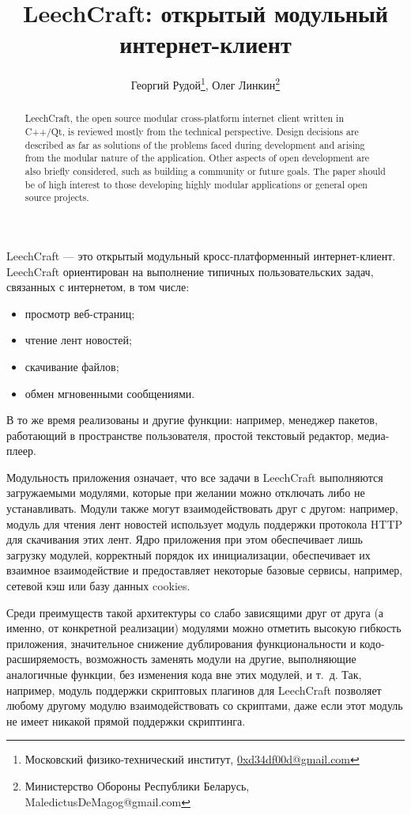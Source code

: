 \documentclass[10pt, a5paper]{article}
\begin{document}
\title{LeechCraft: открытый модульный интернет-клиент}

\author{Георгий Рудой\footnote{Московский физико-технический институт, \url{0xd34df00d@gmail.com}}, Олег Линкин\footnote{Министерство Обороны Республики Беларусь, MaledictusDeMagog@gmail.com}}
\date{}
\maketitle

\begin{abstract}
LeechCraft, the open source modular
cross-platform internet client written in C++/Qt, is reviewed mostly from the
technical perspective. Design decisions are described as far as solutions of
the problems faced during development and arising from the modular
nature of the application. Other aspects of open development are also
briefly considered, such as building a community or future goals. 
The paper should be of high interest to those developing highly modular
applications or general open source projects.
\end{abstract}

LeechCraft --- это открытый модульный кросс-платформенный
интернет-клиент. LeechCraft ориентирован на выполнение типичных
пользовательских задач, связанных с интернетом, в том числе:
\begin{itemize}
	\item просмотр веб-страниц;
	\item чтение лент новостей;
	\item скачивание файлов;
	\item обмен мгновенными сообщениями. 
\end{itemize}
В то же время реализованы и другие функции: например, менеджер
пакетов, работающий в пространстве пользователя, простой текстовый
редактор, медиа-плеер.

Модульность приложения означает, что все задачи в LeechCraft
выполняются загружаемыми модулями, которые при желании можно отключать
либо не устанавливать. Модули также могут взаимодействовать друг с
другом: например, модуль для чтения лент новостей использует модуль
поддержки протокола HTTP для скачивания этих лент. Ядро приложения при
этом обеспечивает лишь загрузку модулей, корректный порядок их
инициализации, обеспечивает их взаимное взаимодействие и предоставляет
некоторые базовые сервисы, например, сетевой кэш или базу данных
cookies.

Среди преимуществ такой архитектуры со слабо зависящими друг от друга
(а именно, от конкретной реализации) модулями можно отметить высокую
гибкость приложения, значительное снижение дублирования
функциональности и кодо-расширяемость, возможность заменять модули на
другие, выполняющие аналогичные функции, без изменения кода вне этих
модулей, и т.~д. Так, например, модуль поддержки скриптовых плагинов
для LeechCraft позволяет любому другому модулю взаимодействовать со
скриптами, даже если этот модуль не имеет никакой прямой поддержки скриптинга.
\end{document}
